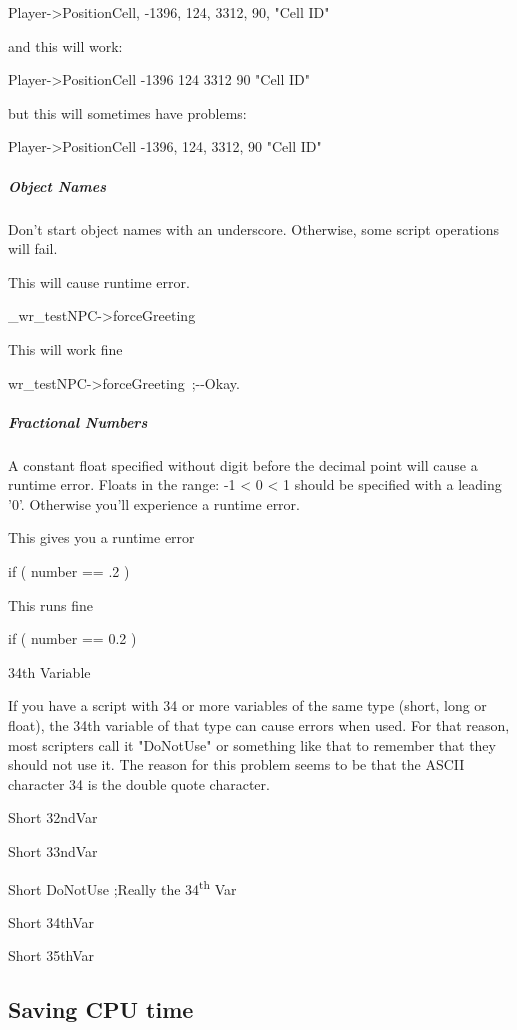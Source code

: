 Player-\textgreater PositionCell, -1396, 124, 3312, 90, "Cell ID"

and this will work:

Player-\textgreater PositionCell -1396 124 3312 90 "Cell ID"

but this will sometimes have problems:

Player-\textgreater PositionCell -1396, 124, 3312, 90 "Cell ID"

\hypertarget{object-names}{%
\subparagraph{Object Names}\label{object-names}}

Don't start object names with an underscore. Otherwise, some script
operations will fail.

This will cause runtime error.

\_wr\_testNPC-\textgreater forceGreeting

This will work fine

wr\_testNPC-\textgreater forceGreeting~;-\/-Okay.

\hypertarget{fractional-numbers}{%
\subparagraph{Fractional Numbers}\label{fractional-numbers}}

A constant float specified without digit before the decimal point will
cause a runtime error. Floats in the range: -1 \textless{} 0 \textless{}
1 should be specified with a leading '0'. Otherwise you'll experience a
runtime error.

This gives you a runtime error

if ( number == .2 )~

This runs fine

if ( number == 0.2 )

34th Variable

If you have a script with 34 or more variables of the same type (short,
long or float), the 34th variable of that type can cause errors when
used. For that reason, most scripters call it "DoNotUse" or something
like that to remember that they should not use it. The reason for this
problem seems to be that the ASCII character 34 is the double quote
character.

Short 32ndVar

Short 33ndVar

Short DoNotUse ;Really the 34\textsuperscript{th} Var

Short 34thVar

Short 35thVar

\hypertarget{saving-cpu-time}{%
\subsection{\texorpdfstring{\hfill\break
Saving CPU time}{ Saving CPU time}}\label{saving-cpu-time}}

